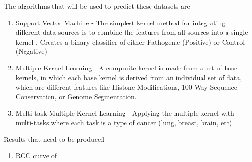 \documentclass[11pt]{article}
\begin{document}
The algorithms that will be used to predict these datasets are
\begin{enumerate}
	\item Support Vector Machine - The simplest kernel method for integrating different data sources is to combine the features from all sources into a single kernel \cite{Rogers2017}. Creates a binary classifier of either Pathogenic (Positive) or Control (Negative)
	\item Multiple Kernel Learning - A composite kernel is made from a set of base kernels, in which each base kernel is derived from an individual set of data, which are different features like Histone Modifications, 100-Way Sequence Conservation, or Genome Segmentation. \cite{Shihab2015}
	\item Multi-task Multiple Kernel Learning - Applying the multiple kernel with multi-tasks where each task is a type of cancer (lung, breast, brain, etc) \cite{Widmer2015}
\end{enumerate}


Results that need to be produced
\begin{enumerate}
	\item ROC curve of 
\end{enumerate}
\end{document}
